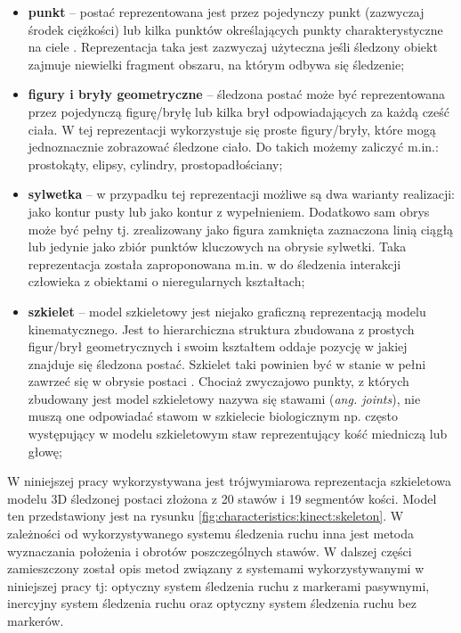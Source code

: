\begin{itemize}
	\item \textbf{punkt} -- postać reprezentowana jest przez pojedynczy punkt (zazwyczaj środek ciężkości) \cite{Veenman2001} lub kilka punktów określających punkty charakterystyczne na ciele \cite{Serby2004}. Reprezentacja taka jest zazwyczaj użyteczna jeśli śledzony obiekt zajmuje niewielki fragment obszaru, na którym odbywa się śledzenie;
	\item \textbf{figury i bryły geometryczne} -- śledzona postać może być reprezentowana przez pojedynczą figurę/bryłę \cite{Comaniciu2003} lub kilka brył odpowiadających za każdą cześć ciała. W tej reprezentacji wykorzystuje się proste figury/bryły, które mogą jednoznacznie zobrazować śledzone ciało. Do takich możemy zaliczyć m.in.: prostokąty, elipsy, cylindry, prostopadłościany;
	\item \textbf{sylwetka} -- w przypadku tej reprezentacji możliwe są dwa warianty realizacji: jako kontur pusty lub jako kontur z wypełnieniem. Dodatkowo sam obrys może być pełny tj. zrealizowany jako figura zamknięta zaznaczona linią ciągłą lub jedynie jako zbiór punktów kluczowych na obrysie sylwetki. Taka reprezentacja została zaproponowana m.in. w \cite{Yilmaz2004} do śledzenia interakcji człowieka z obiektami o nieregularnych kształtach;
	\item \textbf{szkielet} -- model szkieletowy jest niejako graficzną reprezentacją modelu kinematycznego. Jest to hierarchiczna struktura zbudowana z prostych figur/brył geometrycznych i swoim kształtem oddaje pozycję w jakiej znajduje się śledzona postać. Szkielet taki powinien być w stanie w pełni zawrzeć się w obrysie postaci \cite{Ali2001}. Chociaż zwyczajowo punkty, z których zbudowany jest model szkieletowy nazywa się stawami (\emph{ang. joints}), nie muszą one odpowiadać stawom w szkielecie biologicznym np. często występujący w modelu szkieletowym staw reprezentujący kość miedniczą lub głowę;
\end{itemize}

W niniejszej pracy wykorzystywana jest trójwymiarowa reprezentacja szkieletowa modelu 3D śledzonej postaci złożona z 20 stawów i 19 segmentów kości. Model ten przedstawiony jest na rysunku \ref{fig:characteristics:kinect:skeleton}. W zależności od wykorzystywanego systemu śledzenia ruchu inna jest metoda wyznaczania położenia i obrotów poszczególnych stawów. W dalszej części zamieszczony został opis metod związany z systemami wykorzystywanymi w niniejszej pracy tj: optyczny system śledzenia ruchu z markerami pasywnymi, inercyjny system śledzenia ruchu oraz optyczny system śledzenia ruchu bez markerów.
		
